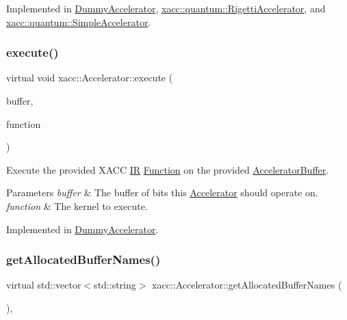 Implemented in \hyperlink{a00976_aa645e7ba6343aa9812836d1e141bd7c8}{Dummy\+Accelerator}, \hyperlink{a00916_a731551c94b1abef40d2cf032e8712df6}{xacc\+::quantum\+::\+Rigetti\+Accelerator}, and \hyperlink{a00944_adb9393692e9f484df241aa5d014030d1}{xacc\+::quantum\+::\+Simple\+Accelerator}.

\mbox{\label{a01084_a89b3f3e6294f228abf03a410b0fb1674}} 
\subsubsection{\texorpdfstring{execute()}{execute()}}
{\footnotesize\ttfamily virtual void xacc\+::\+Accelerator\+::execute (\begin{DoxyParamCaption}\item[{std\+::shared\+\_\+ptr$<$ \hyperlink{a01096}{Accelerator\+Buffer} $>$}]{buffer,  }\item[{const std\+::shared\+\_\+ptr$<$ \hyperlink{a01124}{Function} $>$}]{function }\end{DoxyParamCaption})\hspace{0.3cm}{\ttfamily [pure virtual]}}

Execute the provided X\+A\+CC \hyperlink{a01148}{IR} \hyperlink{a01124}{Function} on the provided \hyperlink{a01096}{Accelerator\+Buffer}.


\begin{DoxyParams}{Parameters}
{\em buffer} & The buffer of bits this \hyperlink{a01084}{Accelerator} should operate on. \\
\hline
{\em function} & The kernel to execute. \\
\hline
\end{DoxyParams}


Implemented in \hyperlink{a00976_a389ba22af5d0d964f5d5367f01712b3c}{Dummy\+Accelerator}.

\mbox{\label{a01084_ae1463d7e405df89fa4af47e8922f4b82}} 
\subsubsection{\texorpdfstring{get\+Allocated\+Buffer\+Names()}{getAllocatedBufferNames()}}
{\footnotesize\ttfamily virtual std\+::vector$<$std\+::string$>$ xacc\+::\+Accelerator\+::get\+Allocated\+Buffer\+Names (\begin{DoxyParamCaption}{ }\end{DoxyParamCaption})\hspace{0.3cm}{\ttfamily [inline]}, {\ttfamily [virtual]}}

